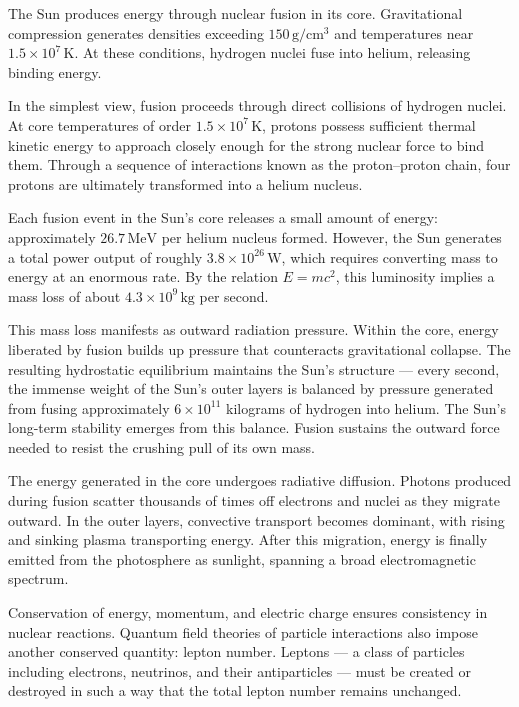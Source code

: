 The Sun produces energy through nuclear fusion in its core. Gravitational compression generates densities exceeding $150\,\text{g}/\text{cm}^3$ and temperatures near $1.5 \times 10^7\,\text{K}$. At these conditions, hydrogen nuclei fuse into helium, releasing binding energy.

In the simplest view, fusion proceeds through direct collisions of hydrogen nuclei. At core temperatures of order $1.5 \times 10^7\,\text{K}$, protons possess sufficient thermal kinetic energy to approach closely enough for the strong nuclear force to bind them. Through a sequence of interactions known as the proton–proton chain, four protons are ultimately transformed into a helium nucleus. 

Each fusion event in the Sun's core releases a small amount of energy: approximately $26.7\,\text{MeV}$ per helium nucleus formed. However, the Sun generates a total power output of roughly $3.8 \times 10^{26}\,\text{W}$, which requires converting mass to energy at an enormous rate. By the relation $E = mc^2$, this luminosity implies a mass loss of about $4.3 \times 10^9\,\text{kg}$ per second.

This mass loss manifests as outward radiation pressure. Within the core, energy liberated by fusion builds up pressure that counteracts gravitational collapse. The resulting hydrostatic equilibrium maintains the Sun's structure — every second, the immense weight of the Sun's outer layers is balanced by pressure generated from fusing approximately $6 \times 10^{11}$ kilograms of hydrogen into helium. The Sun's long-term stability emerges from this balance. Fusion sustains the outward force needed to resist the crushing pull of its own mass.

The energy generated in the core undergoes radiative diffusion. Photons produced during fusion scatter thousands of times off electrons and nuclei as they migrate outward. In the outer layers, convective transport becomes dominant, with rising and sinking plasma transporting energy. After this migration, energy is finally emitted from the photosphere as sunlight, spanning a broad electromagnetic spectrum.

Conservation of energy, momentum, and electric charge ensures consistency in nuclear reactions. Quantum field theories of particle interactions also impose another conserved quantity: lepton number. Leptons — a class of particles including electrons, neutrinos, and their antiparticles — must be created or destroyed in such a way that the total lepton number remains unchanged.


